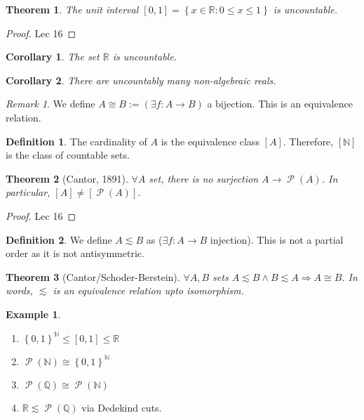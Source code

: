\documentclass{article}
\newcommand\N{\ensuremath{\mathbb{N}}}
\newcommand\R{\ensuremath{\mathbb{R}}}
\newcommand\Q{\ensuremath{\mathbb{Q}}}
\DeclareMathOperator{\ps}{\mathcal{P}}
\newtheorem{theorem}{Theorem}[section]
\newtheorem{corollary}{Corollary}[theorem]
\theoremstyle{definition}
\newtheorem{definition}{Definition}[subsection]
\newtheorem{eg}{Example}[subsection]
\theoremstyle{remark}
\newtheorem*{remark}{Remark}
\theoremstyle{plain}
\begin{document}
\begin{theorem}
    The unit interval \([0,1] = \left\{ x \in \R: 0 \leq x \leq 1 \right\}\) is uncountable.
\end{theorem}
\begin{proof}
    Lec 16
\end{proof}

\begin{corollary}
    The set \(\R\) is uncountable. 
\end{corollary}

\begin{corollary}
    There are uncountably many non-algebraic reals. 
\end{corollary}

\begin{remark}
    We define \(A \cong B := (\exists f: A \to B)\) a bijection. This is an equivalence relation. 
\end{remark}

\begin{definition}
    The cardinality of \(A\) is the equivalence class \([A]\). Therefore, \([\N]\) is the class of countable sets.
\end{definition}

\begin{theorem}[Cantor, 1891]
    \(\forall A\) set, there is no surjection \(A \to \ps(A)\). In particular, \([A] \neq [\ps(A)]\).
\end{theorem}
\begin{proof}
    Lec 16
\end{proof}

\begin{definition}
    We define \(A \lesssim B\) as (\(\exists f: A \to B\) injection). This is not a partial order as it is not antisymmetric. 
\end{definition}

\begin{theorem}[Cantor/Schoder-Berstein]
    \(\forall A,B\) sets \(A \lesssim B \land B \lesssim A \Rightarrow A \cong B\). In words, \(\lesssim\) is an equivalence relation upto isomorphism.
\end{theorem}

\begin{eg}
    \begin{enumerate}
        \item \(\left\{ 0,1 \right\}^{\N} \leq [0,1] \leq \R\)
        \item \(\ps(\N) \cong \left\{ 0,1 \right\}^{\N}\)
        \item \(\ps(\Q) \cong \ps(\N)\)
        \item \(\R \lesssim \ps(\Q)\) via Dedekind cuts. 
    \end{enumerate}
\end{eg}
\end{document}
